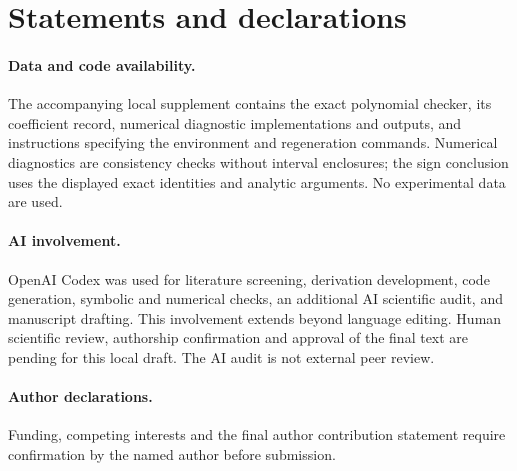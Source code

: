 \documentclass[11pt]{article}
\begin{document}
\section*{Statements and declarations}
\paragraph{Data and code availability.}
The accompanying local supplement contains the exact polynomial checker, its coefficient record, numerical diagnostic implementations and outputs, and instructions specifying the environment and regeneration commands. Numerical diagnostics are consistency checks without interval enclosures; the sign conclusion uses the displayed exact identities and analytic arguments. No experimental data are used.

\paragraph{AI involvement.}
OpenAI Codex was used for literature screening, derivation development, code generation, symbolic and numerical checks, an additional AI scientific audit, and manuscript drafting. This involvement extends beyond language editing. Human scientific review, authorship confirmation and approval of the final text are pending for this local draft. The AI audit is not external peer review.

\paragraph{Author declarations.}
Funding, competing interests and the final author contribution statement require confirmation by the named author before submission.



\end{document}
